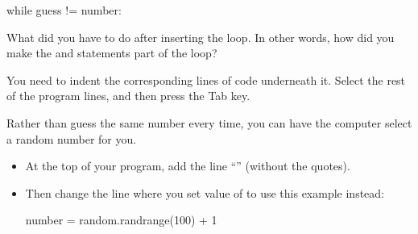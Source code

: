 \begin{pythlst}
    while guess != number:
\end{pythlst}

\vspace{1em}


\Q What did you have to do after inserting the  loop.
In other words, how did you make the  and  statements part of the  loop?

\begin{answer}
You need to indent the corresponding lines of code underneath it.
Select the rest of the program lines, and then press the Tab key.
\end{answer}


\Q Rather than guess the same number every time, you can have the computer select a random number for you.
\begin{itemize}
\item At the top of your program, add the line ``'' (without the quotes).
\item Then change the line where you set value of  to use this example instead:
\begin{pythlst}
number = random.randrange(100) + 1
\end{pythlst}
\end{itemize}
